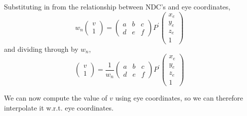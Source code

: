 \documentclass[11pt]{tingpset}
\begin{document}
  Substituting in from the relationship between NDC's and eye coordinates,
  \[
    w_n
    \begin{pmatrix}
      v \\
      1
    \end{pmatrix}
    =
    \begin{pmatrix}
      a & b & c \\
      d & e & f
    \end{pmatrix}
    P^\prime
    \begin{pmatrix}
      x_e \\
      y_e \\
      z_e \\
      1
    \end{pmatrix}
  \]
  and dividing through by $w_n$,
  \[
    \begin{pmatrix}
      v \\
      1
    \end{pmatrix}
    =
    \frac{1}{w_n}
    \begin{pmatrix}
      a & b & c \\
      d & e & f
    \end{pmatrix}
    P^\prime
    \begin{pmatrix}
      x_e \\
      y_e \\
      z_e \\
      1
    \end{pmatrix}
  \]

  We can now compute the value of $v$ using eye coordinates, so we can therefore interpolate it w.r.t. eye coordinates.
\end{document}
